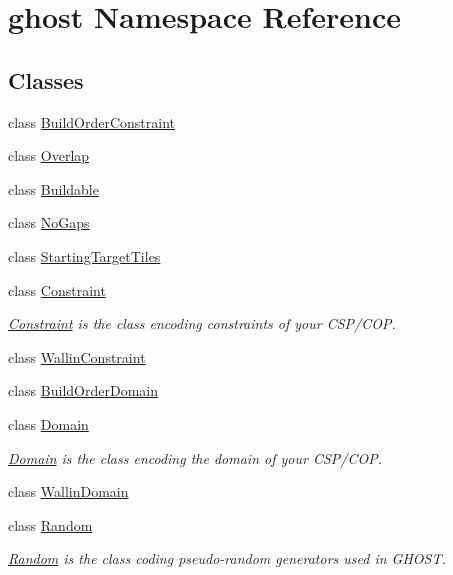 \hypertarget{namespaceghost}{\section{ghost Namespace Reference}
\label{namespaceghost}
}
\subsection*{Classes}
\begin{DoxyCompactItemize}
\item 
class \hyperlink{classghost_1_1BuildOrderConstraint}{Build\-Order\-Constraint}
\item 
class \hyperlink{classghost_1_1Overlap}{Overlap}
\item 
class \hyperlink{classghost_1_1Buildable}{Buildable}
\item 
class \hyperlink{classghost_1_1NoGaps}{No\-Gaps}
\item 
class \hyperlink{classghost_1_1StartingTargetTiles}{Starting\-Target\-Tiles}
\item 
class \hyperlink{classghost_1_1Constraint}{Constraint}
\begin{DoxyCompactList}\small\item\em \hyperlink{classghost_1_1Constraint}{Constraint} is the class encoding constraints of your C\-S\-P/\-C\-O\-P. \end{DoxyCompactList}\item 
class \hyperlink{classghost_1_1WallinConstraint}{Wallin\-Constraint}
\item 
class \hyperlink{classghost_1_1BuildOrderDomain}{Build\-Order\-Domain}
\item 
class \hyperlink{classghost_1_1Domain}{Domain}
\begin{DoxyCompactList}\small\item\em \hyperlink{classghost_1_1Domain}{Domain} is the class encoding the domain of your C\-S\-P/\-C\-O\-P. \end{DoxyCompactList}\item 
class \hyperlink{classghost_1_1WallinDomain}{Wallin\-Domain}
\item 
class \hyperlink{classghost_1_1Random}{Random}
\begin{DoxyCompactList}\small\item\em \hyperlink{classghost_1_1Random}{Random} is the class coding pseudo-\/random generators used in G\-H\-O\-S\-T. \end{DoxyCompactList}\item 

\end{DoxyCompactItemize}
